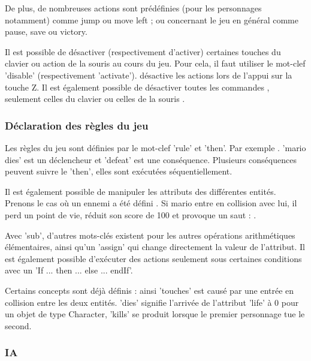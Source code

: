 De plus, de nombreuses actions sont prédéfinies (pour les personnages notamment) comme jump ou move left ; ou concernant le jeu en général comme pause, save ou victory.
 

Il est possible de désactiver (respectivement d'activer) certaines touches du clavier ou action de la souris au cours du jeu.
Pour cela, il faut utiliser le mot-clef 'disable' (respectivement 'activate').
 désactive les actions lors de l'appui sur la touche Z.
Il est également possible de désactiver toutes les commandes , seulement celles du clavier  ou celles de la souris .

\subsubsection{Déclaration des règles du jeu}

Les règles du jeu sont définies par le mot-clef 'rule' et 'then'.
Par exemple .
'mario dies' est un déclencheur et 'defeat' est une conséquence.
Plusieurs conséquences peuvent suivre le 'then', elles sont exécutées séquentiellement.

Il est également possible de manipuler les attributs des différentes entités. Prenons le cas où un ennemi a été défini .
Si mario entre en collision avec lui, il perd un point de vie, réduit son score de 100 et provoque un saut :
 .

Avec 'sub', d'autres mots-clés existent pour les autres opérations arithmétiques élémentaires, ainsi qu'un 'assign' qui change directement
la valeur de l'attribut.
Il est également possible d'exécuter des actions seulement sous certaines conditions avec un 'If ... then ... else ... endIf'.

Certains concepts sont déjà définis : ainsi 'touches' est causé par une entrée en collision entre les deux entités. 'dies' signifie l'arrivée de l'attribut
'life' à 0 pour un objet de type Character, 'kills' se produit lorsque le premier personnage tue le second.

\subsubsection{IA}

